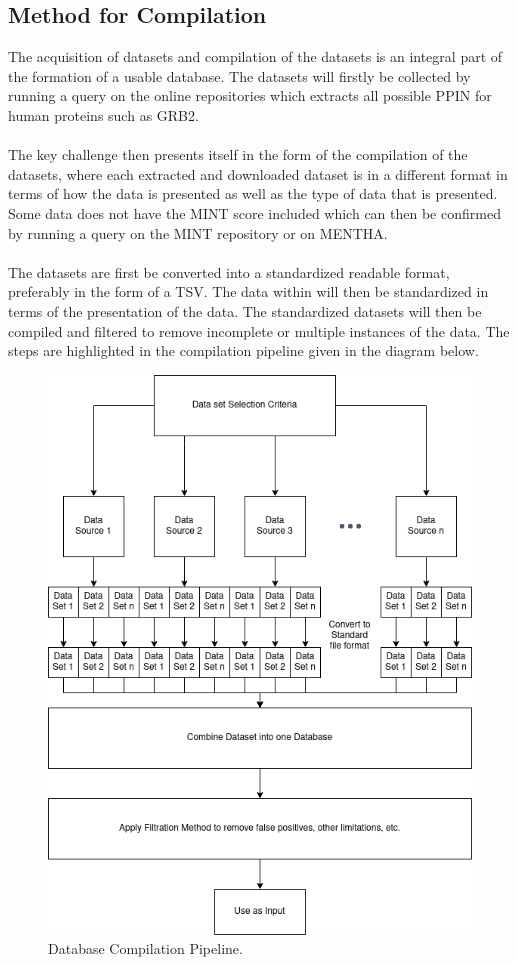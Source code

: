 \subsection{Method for Compilation}
The acquisition of datasets and compilation of the datasets is an integral part of the formation of a usable database. The datasets will firstly be collected by running a query on the online repositories which extracts all possible PPIN for human proteins such as GRB2.\\\\The key challenge then presents itself in the form of the compilation of the datasets, where each extracted and downloaded dataset is in a different format in terms of how the data is presented as well as the type of data that is presented. Some data does not have the MINT score included which can then be confirmed by running a query on the MINT repository or on MENTHA.\\\\
The datasets are first be converted into a standardized readable format, preferably in the form of a TSV. The data within will then be standardized in terms of the presentation of the data. The standardized datasets will then be compiled and filtered to remove incomplete or multiple instances of the data. The steps are highlighted in the compilation pipeline given in the diagram below.
\begin{figure}[h!]
    \centering
\includegraphics[scale=0.7]{Documentation/Final-Report-Kavish-1/dataset-comp.png}
\caption{Database Compilation Pipeline.}
\label{fig: data_pipelinediag}
\end{figure}


